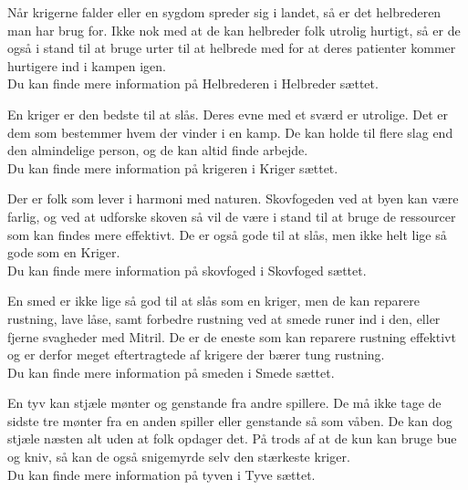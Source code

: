 \begin{prof*}[Helbreder]
Når krigerne falder eller en sygdom spreder sig i landet, så er det helbrederen man har brug for. Ikke nok med at de kan helbreder folk utrolig hurtigt, så er de også i stand til at bruge urter til at helbrede med for at deres patienter kommer hurtigere ind i kampen igen.\\
Du kan finde mere information på Helbrederen i Helbreder sættet.
\end{prof*}

\begin{prof*}[Kriger]
En kriger er den bedste til at slås. Deres evne med et sværd er utrolige. Det er dem som bestemmer hvem der vinder i en kamp. De kan holde til flere slag end den almindelige person, og de kan altid finde arbejde.\\
Du kan finde mere information på krigeren i Kriger sættet.
\end{prof*}

\begin{prof*}[Skovfoged]
Der er folk som lever i harmoni med naturen. Skovfogeden ved at byen kan være farlig, og ved at udforske skoven så vil de være i stand til at bruge de ressourcer som kan findes mere effektivt. De er også gode til at slås, men ikke helt lige så gode som en Kriger.\\
Du kan finde mere information på skovfoged i Skovfoged sættet.
\end{prof*}

\begin{prof*}[Smed]
En smed er ikke lige så god til at slås som en kriger, men de kan reparere rustning, lave låse, samt forbedre rustning ved at smede runer ind i den, eller fjerne svagheder med Mitril. De er de eneste som kan reparere rustning effektivt og er derfor meget eftertragtede af krigere der bærer tung rustning.\\
Du kan finde mere information på smeden i Smede sættet.
\end{prof*}

\begin{prof*}[Tyv]
En tyv kan stjæle mønter og genstande fra andre spillere. De må ikke tage de sidste tre mønter fra en anden spiller eller genstande så som våben. De kan dog stjæle næsten alt uden at folk opdager det. På trods af at de kun kan bruge bue og kniv, så kan de også snigemyrde selv den stærkeste kriger.\\
Du kan finde mere information på tyven i Tyve sættet.
\end{prof*}

